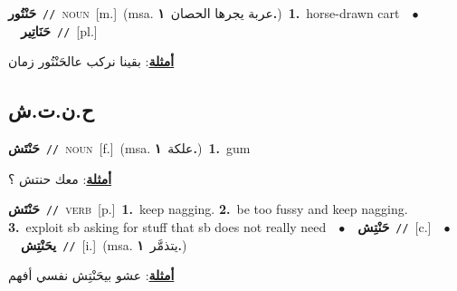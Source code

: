 \documentclass[10pt,a4paper,twoside]{article} %
\begin{document}
\begin{multicols}{2}
{\setlength\topsep{0pt}\textbf{\foreignlanguage{arabic}{حَنْتُور}}\ {\color{gray}\texttt{//}\color{black}}\ \textsc{noun}\ [m.]\ \color{gray}(msa. \foreignlanguage{arabic}{عربة يجرها الحصان}~\foreignlanguage{arabic}{\textbf{١.}})\color{black}\ \textbf{1.}~horse-drawn cart\ \ $\bullet$\ \ \setlength\topsep{0pt}\textbf{\foreignlanguage{arabic}{حَنَاتِير}}\ {\color{gray}\texttt{//}\color{black}}\ [pl.]\  \begin{flushright}\color{gray}\foreignlanguage{arabic}{\textbf{\underline{\foreignlanguage{arabic}{أمثلة}}}: بقينا نركب عالحَنْتُور زمان}\end{flushright}\color{black}} \vspace{2mm}

\vspace{-3mm}
\subsection*{\color{blue}\foreignlanguage{arabic}{ح.ن.ت.ش}\color{blue}{}} 

{\setlength\topsep{0pt}\textbf{\foreignlanguage{arabic}{حَنْتَش}}\ {\color{gray}\texttt{//}\color{black}}\ \textsc{noun}\ [f.]\ \color{gray}(msa. \foreignlanguage{arabic}{علكة}~\foreignlanguage{arabic}{\textbf{١.}})\color{black}\ \textbf{1.}~gum\  \begin{flushright}\color{gray}\foreignlanguage{arabic}{\textbf{\underline{\foreignlanguage{arabic}{أمثلة}}}: معك حنتش ؟}\end{flushright}\color{black}} \vspace{2mm}

{\setlength\topsep{0pt}\textbf{\foreignlanguage{arabic}{حَنْتَش}}\ {\color{gray}\texttt{//}\color{black}}\ \textsc{verb}\ [p.]\ \textbf{1.}~keep nagging.  \textbf{2.}~be too fussy and keep nagging.  \textbf{3.}~exploit sb asking for stuff that sb does not really need\ \ $\bullet$\ \ \setlength\topsep{0pt}\textbf{\foreignlanguage{arabic}{حَنْتِش}}\ {\color{gray}\texttt{//}\color{black}}\ [c.]\ \ $\bullet$\ \ \setlength\topsep{0pt}\textbf{\foreignlanguage{arabic}{يحَنْتِش}}\ {\color{gray}\texttt{//}\color{black}}\ [i.]\ \color{gray}(msa. \foreignlanguage{arabic}{يتذمَّر}~\foreignlanguage{arabic}{\textbf{١.}})\color{black}\  \begin{flushright}\color{gray}\foreignlanguage{arabic}{\textbf{\underline{\foreignlanguage{arabic}{أمثلة}}}: عشو بيحَنْتِش نفسي أفهم}\end{flushright}\color{black}} \vspace{2mm}


\end{multicols}
\end{document}
